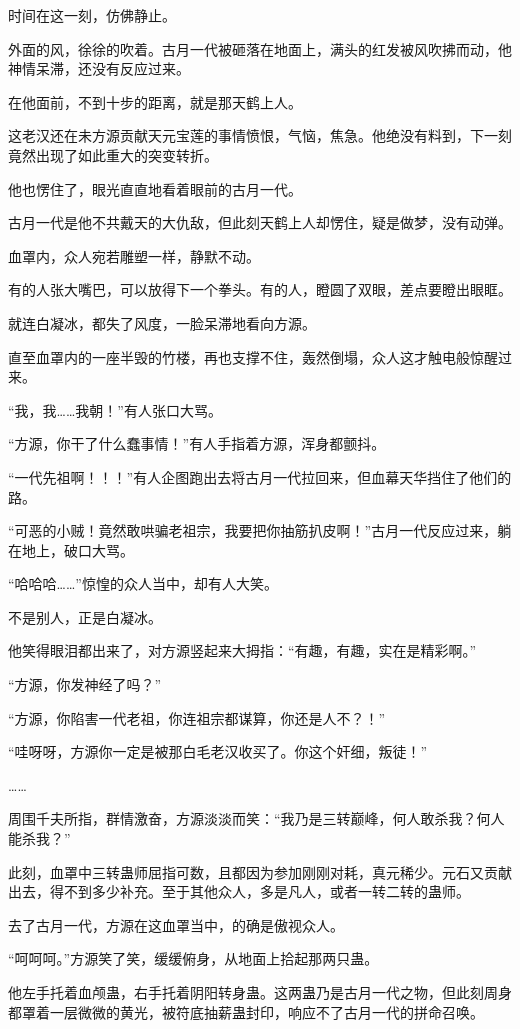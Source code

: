 \begin{this_body}
时间在这一刻，仿佛静止。

外面的风，徐徐的吹着。古月一代被砸落在地面上，满头的红发被风吹拂而动，他神情呆滞，还没有反应过来。

在他面前，不到十步的距离，就是那天鹤上人。

这老汉还在未方源贡献天元宝莲的事情愤恨，气恼，焦急。他绝没有料到，下一刻竟然出现了如此重大的突变转折。

他也愣住了，眼光直直地看着眼前的古月一代。

古月一代是他不共戴天的大仇敌，但此刻天鹤上人却愣住，疑是做梦，没有动弹。

血罩内，众人宛若雕塑一样，静默不动。

有的人张大嘴巴，可以放得下一个拳头。有的人，瞪圆了双眼，差点要瞪出眼眶。

就连白凝冰，都失了风度，一脸呆滞地看向方源。

直至血罩内的一座半毁的竹楼，再也支撑不住，轰然倒塌，众人这才触电般惊醒过来。

“我，我……我朝！”有人张口大骂。

“方源，你干了什么蠢事情！”有人手指着方源，浑身都颤抖。

“一代先祖啊！！！”有人企图跑出去将古月一代拉回来，但血幕天华挡住了他们的路。

“可恶的小贼！竟然敢哄骗老祖宗，我要把你抽筋扒皮啊！”古月一代反应过来，躺在地上，破口大骂。

“哈哈哈……”惊惶的众人当中，却有人大笑。

不是别人，正是白凝冰。

他笑得眼泪都出来了，对方源竖起来大拇指：“有趣，有趣，实在是精彩啊。”

“方源，你发神经了吗？”

“方源，你陷害一代老祖，你连祖宗都谋算，你还是人不？！”

“哇呀呀，方源你一定是被那白毛老汉收买了。你这个奸细，叛徒！”

……

周围千夫所指，群情激奋，方源淡淡而笑：“我乃是三转巅峰，何人敢杀我？何人能杀我？”

此刻，血罩中三转蛊师屈指可数，且都因为参加刚刚对耗，真元稀少。元石又贡献出去，得不到多少补充。至于其他众人，多是凡人，或者一转二转的蛊师。

去了古月一代，方源在这血罩当中，的确是傲视众人。

“呵呵呵。”方源笑了笑，缓缓俯身，从地面上拾起那两只蛊。

他左手托着血颅蛊，右手托着阴阳转身蛊。这两蛊乃是古月一代之物，但此刻周身都罩着一层微微的黄光，被符底抽薪蛊封印，响应不了古月一代的拼命召唤。


\end{this_body}
